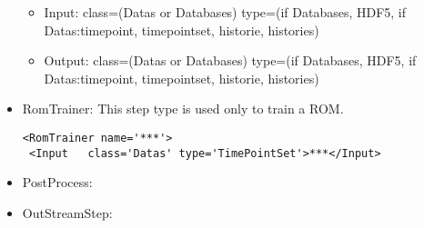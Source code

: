 \begin{itemize}
\begin{itemize}
\item Input: class=(Datas or Databases) type=(if Databases, HDF5, if Datas:timepoint, timepointset, historie, histories) 
\item Output: class=(Datas or Databases) type=(if Databases, HDF5, if Datas:timepoint, timepointset, historie, histories) 
\end{itemize}
\label{subsec:stepTraining}
\item RomTrainer: This step type is used only to train a ROM. 
\begin{lstlisting}[style=XML]
<RomTrainer name='***'>
 <Input   class='Datas' type='TimePointSet'>***</Input>
\end{lstlisting}
\item PostProcess:
\item OutStreamStep:
\end{itemize}











